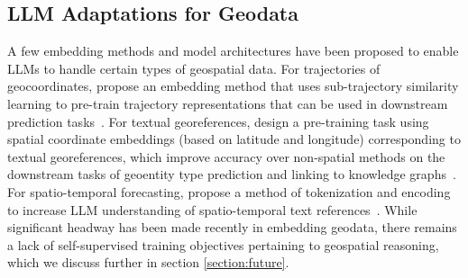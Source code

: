 \subsection{LLM Adaptations for Geodata}
A few embedding methods and model architectures have been proposed to enable LLMs to handle certain types of geospatial data.
%
For trajectories of geocoordinates, \citeauthor{Hu2023} propose an embedding method that uses sub-trajectory similarity learning to pre-train trajectory representations that can be used in downstream prediction tasks~\cite{Hu2023}.
%
For textual georeferences, \citeauthor{Li2021} design a pre-training task using spatial coordinate embeddings (based on latitude and longitude) corresponding to textual georeferences, which improve
 accuracy over non-spatial methods on the downstream tasks of geoentity type prediction and linking to knowledge graphs~\cite{Li2021}.
For spatio-temporal forecasting, \citeauthor{Liu2024large} propose a method of tokenization and encoding to increase LLM understanding of spatio-temporal text references~\cite{Liu2024large}.
While significant headway has been made recently in embedding geodata, there remains a lack of self-supervised training objectives pertaining to geospatial reasoning, which we discuss further in section \ref{section:future}.



 









